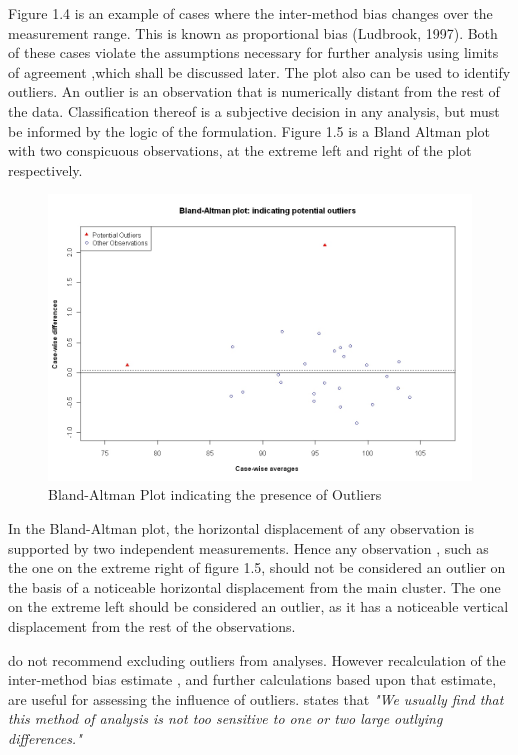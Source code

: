 \documentclass[Chap1main.tex]{subfiles}
\begin{document}
\newpage
Figure 1.4 is an example of cases where the inter-method bias
changes over the measurement range. This is known as proportional
bias (Ludbrook, 1997). Both of these cases violate the assumptions
necessary for further analysis using limits of agreement ,which
shall be discussed later. The plot also can be used to identify
outliers. An outlier is an observation that is numerically distant
from the rest of the data. Classification thereof is a subjective
decision in any analysis, but must be informed by the logic of the
formulation. Figure 1.5 is a Bland Altman plot with two
conspicuous observations, at the extreme left and right of the
plot respectively.


\begin{figure}[h!]
\begin{center}
  \includegraphics[width=125mm]{BAOutliers.jpeg}
  \caption{Bland-Altman Plot indicating the presence of Outliers}\label{PropBias}
\end{center}
\end{figure}

In the Bland-Altman plot, the horizontal displacement of any
observation is supported by two independent measurements. Hence
any observation , such as the one on the extreme right of figure
1.5, should not be considered an outlier on the basis of a
noticeable horizontal displacement from the main cluster. The one
on the extreme left should be considered an outlier, as it has a
noticeable vertical displacement from the rest of the
observations.

\citet*{BA99} do not recommend excluding outliers from analyses.
However recalculation of the inter-method bias estimate , and
further calculations based upon that estimate, are useful for
assessing the influence of outliers.\citep{BA99} states that
\emph{"We usually find that this method of analysis is not too
sensitive to one or two large outlying differences."}
\end{document}
